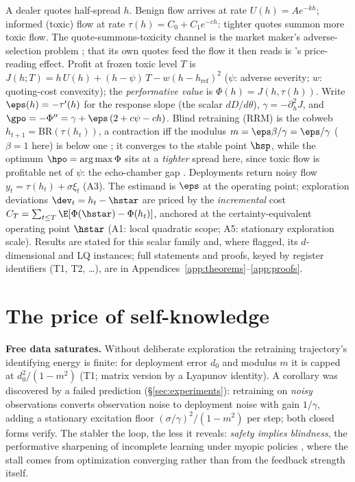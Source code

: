 \documentclass{article}
\begin{document}
A dealer quotes half-spread $h$. Benign flow arrives at rate $U(h) = A e^{-kh}$; informed (toxic) flow at rate $\tau(h) = C_0 + C_1 e^{-c h}$: tighter quotes summon more toxic flow. The quote-summons-toxicity channel is the market maker's adverse-selection problem \citep{gueant2013inventory}; that its own quotes feed the flow it then reads is \citet{barzykin2026quoting}'s price-reading effect. Profit at frozen toxic level $T$ is $J(h;T) = h\,U(h) + (h - \psi)\,T - w (h - h_{\mathrm{ref}})^2$ ($\psi$: adverse severity; $w$: quoting-cost convexity); the \emph{performative value} is $\Phi(h) = J(h,\tau(h))$. Write $\eps(h) = -\tau'(h)$ for the response slope (the scalar $dD/d\theta$), $\gamma = -\partial^2_h J$, and $\gpo = -\Phi'' = \gamma + \eps\,(2 + c\psi - ch)$. Blind retraining (RRM) is the cobweb $h_{t+1} = \mathrm{BR}(\tau(h_t))$, a contraction iff the modulus $m = \eps\beta/\gamma = \eps/\gamma$ ($\beta = 1$ here) is below one \citep{perdomo2020performative}; it converges to the stable point $\hsp$, while the optimum $\hpo = \arg\max\Phi$ sits at a \emph{tighter} spread here, since toxic flow is profitable net of $\psi$: the echo-chamber gap \citep{miller2021outside}. Deployments return noisy flow $y_t = \tau(h_t) + \sigma\xi_t$ (A3). The estimand is $\eps$ at the operating point; exploration deviations $\dev_t = h_t - \hstar$ are priced by the \emph{incremental} cost $C_T = \sum_{t \le T} \E[\Phi(\hstar) - \Phi(h_t)]$, anchored at the certainty-equivalent operating point $\hstar$ (A1: local quadratic scope; A5: stationary exploration scale). Results are stated for this scalar family and, where flagged, its $d$-dimensional and LQ instances; full statements and proofs, keyed by register identifiers (T1, T2, \ldots), are in Appendices~\ref{app:theorems}--\ref{app:proofs}.

\section{The price of self-knowledge}
\label{sec:price}

\textbf{Free data saturates.} Without deliberate exploration the retraining trajectory's identifying energy is finite: for deployment error $d_0$ and modulus $m$ it is capped at $d_0^2/(1-m^2)$ (T1; matrix version by a Lyapunov identity). A corollary was discovered by a failed prediction (\S\ref{sec:experiments}): retraining on \emph{noisy} observations converts observation noise to deployment noise with gain $1/\gamma$, adding a stationary excitation floor $(\sigma/\gamma)^2/(1-m^2)$ per step; both closed forms verify. The stabler the loop, the less it reveals: \emph{safety implies blindness}, the performative sharpening of incomplete learning under myopic policies \citep{keskin2014dynamic,harrison2012bayesian}, where the stall comes from optimization converging rather than from the feedback strength itself.
\end{document}
